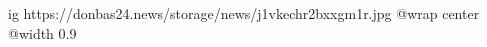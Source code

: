  
 
 
 
 

\ifcmt
  ig https://donbas24.news/storage/news/j1vkechr2bxxgm1r.jpg
  @wrap center
  @width 0.9
\fi
